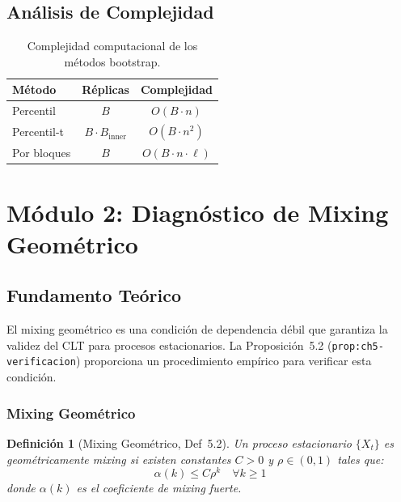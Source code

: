 \documentclass[12pt,a4paper]{article}
\newtheorem{definition}[theorem]{Definición}
\begin{document}
\subsection{Análisis de Complejidad}

\begin{table}[h]
	\centering
	\caption{Complejidad computacional de los métodos bootstrap.}
	\label{tab:complexity}
	\begin{tabular}{@{}lcc@{}}
		\toprule
		Método      & Réplicas                   & Complejidad               \\
		\midrule
		Percentil   & $B$                        & $O(B \cdot n)$            \\
		Percentil-t & $B \cdot B_{\text{inner}}$ & $O(B \cdot n^2)$          \\
		Por bloques & $B$                        & $O(B \cdot n \cdot \ell)$ \\
		\bottomrule
	\end{tabular}
\end{table}

\newpage

\section{Módulo 2: Diagnóstico de Mixing Geométrico}

\subsection{Fundamento Teórico}

El mixing geométrico es una condición de dependencia débil que garantiza la validez del CLT para procesos estacionarios. La Proposición~5.2 (\texttt{prop:ch5-verificacion}) proporciona un procedimiento empírico para verificar esta condición.

\subsubsection{Mixing Geométrico}

\begin{definition}[Mixing Geométrico, Def~5.2]
	Un proceso estacionario $\{X_t\}$ es geométricamente mixing si existen constantes $C > 0$ y $\rho \in (0, 1)$ tales que:
	\[
		\alpha(k) \leq C \rho^k \quad \forall k \geq 1
	\]
	donde $\alpha(k)$ es el coeficiente de mixing fuerte.
\end{definition}
\end{document}
